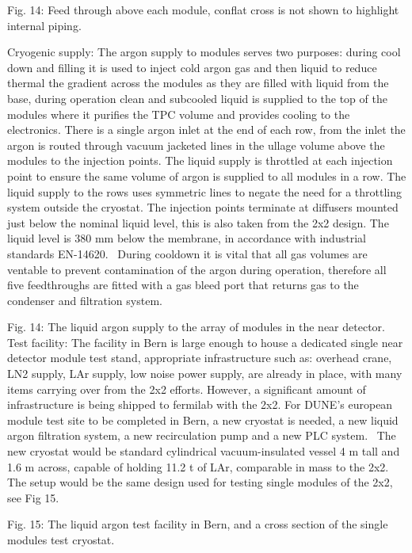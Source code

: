 Fig. 14: Feed through above each module, conflat cross is not shown to highlight internal piping.

Cryogenic supply: The argon supply to modules serves two purposes: during cool down and filling it is used to inject cold argon gas and then liquid to reduce thermal the gradient across the modules as they are filled with liquid from the base, during operation clean and subcooled liquid is supplied to the top of the modules where it purifies the TPC volume and provides cooling to the electronics. There is a single argon inlet at the end of each row, from the inlet the argon is routed through vacuum jacketed lines in the ullage volume above the modules to the injection points. The liquid supply is throttled at each injection point to ensure the same volume of argon is supplied to all modules in a row. The liquid supply to the rows uses symmetric lines to negate the need for a throttling system outside the cryostat. The injection points terminate at diffusers mounted just below the nominal liquid level, this is also taken from the 2x2 design. The liquid level is 380 mm below the membrane, in accordance with industrial standards EN-14620.  During cooldown it is vital that all gas volumes are ventable to prevent contamination of the argon during operation, therefore all five feedthroughs are fitted with a gas bleed port that returns gas to the condenser and filtration system.

Fig. 14: The liquid argon supply to the array of modules in the near detector.
Test facility: The facility in Bern is large enough to house a dedicated single near detector module test stand, appropriate infrastructure such as: overhead crane, LN2 supply, LAr supply, low noise power supply, are already in place, with many items carrying over from the 2x2 efforts. However, a significant amount of infrastructure is being shipped to fermilab with the 2x2. For DUNE’s european module test site to be completed in Bern, a new cryostat is needed, a new liquid argon filtration system, a new recirculation pump and a new PLC system.  The new cryostat would be standard cylindrical vacuum-insulated vessel 4 m tall and 1.6 m across, capable of holding 11.2 t of LAr, comparable in mass to the 2x2. The setup would be the same design used for testing single modules of the 2x2, see Fig 15.
 

Fig. 15: The liquid argon test facility in Bern, and a cross section of the single modules test cryostat.

